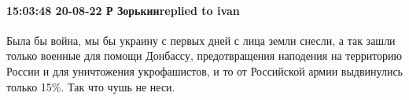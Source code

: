  
 
 
 
 

\paragraph{15:03:48 20-08-22 Р Зорькинreplied to ivan}

Была бы война, мы бы украину с первых дней с лица земли снесли, а так зашли
только военные для помощи Донбассу, предотвращения наподения на территорию
России и для уничтожения укрофашистов, и то от Российской армии выдвинулись
только 15\%. Так что чушь не неси.
